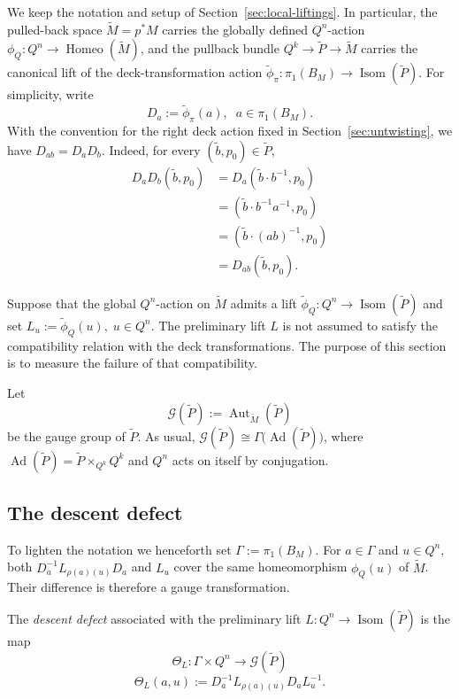 \documentclass[11pt,a4paper]{article}
\numberwithin{equation}{section}
\theoremstyle{named}
\begin{document}
We keep the notation and setup of Section~\ref{sec:local-liftings}. In particular, the pulled-back space \(\widetilde M=p^*M\) carries the globally defined \(Q^n\)-action $\phi_Q:Q^n\longrightarrow\operatorname{Homeo}(\widetilde M)$,
and the pullback bundle $Q^k\longrightarrow\widetilde P\longrightarrow\widetilde M$
carries the canonical lift of the deck-transformation action $\widetilde\phi_\pi:\pi_1(B_M)\longrightarrow
\operatorname{Isom}(\widetilde P)$.
For simplicity, write
\[
D_a:=\widetilde\phi_\pi(a),
\;\; a\in\pi_1(B_M).
\]
With the convention for the right deck action fixed in
Section~\ref{sec:untwisting}, we have $D_{ab}=D_aD_b$. Indeed, for every \((\widetilde b,p_0)\in\widetilde P\),
\begin{align*}
D_aD_b(\widetilde b,p_0)
&=
D_a(\widetilde b\cdot b^{-1},p_0)
\\
&=
(\widetilde b\cdot b^{-1}a^{-1},p_0)
\\
&=
(\widetilde b\cdot (ab)^{-1},p_0)
\\
&=
D_{ab}(\widetilde b,p_0).
\end{align*}

Suppose that the global \(Q^n\)-action on \(\widetilde M\) admits a lift $\widetilde\phi_Q:
Q^n\longrightarrow\operatorname{Isom}(\widetilde P)$ and set $L_u:=\widetilde\phi_Q(u),\;
u\in Q^n$.
The  preliminary lift \(L\) is not assumed to satisfy the compatibility relation with the deck transformations. The purpose of this section is to measure the failure of that compatibility.

Let
\[
\mathcal G(\widetilde P)
:=
\operatorname{Aut}_{\widetilde M}(\widetilde P)
\]
be the gauge group of \(\widetilde P\). As usual, $\mathcal G(\widetilde P)
\cong
\Gamma\bigl(\operatorname{Ad}(\widetilde P)\bigr)$,
where $\operatorname{Ad}(\widetilde P)
=
\widetilde P\times_{Q^k}Q^k$
and \(Q^n\) acts on itself by conjugation. 

\subsection{The descent defect}

To lighten the notation we henceforth set $\Gamma:=\pi_1(B_M)$. For \(a\in\Gamma\) and \(u\in Q^n\), both $D_a^{-1}L_{\rho(a)(u)}D_a$
and $L_u$
cover the same homeomorphism \(\phi_Q(u)\) of \(\widetilde M\). Their difference is therefore a gauge transformation.

\begin{definition}
\label{def:descent-defect}
The \emph{descent defect} associated with the preliminary lift $L:Q^n\longrightarrow\operatorname{Isom}(\widetilde P)$
is the map
\[
\Theta_L:
\Gamma\times Q^n
\longrightarrow
\mathcal G(\widetilde P)
\]
\begin{equation}
\label{eq:descent-defect}
\Theta_L(a,u)
:=
D_a^{-1}L_{\rho(a)(u)}D_aL_u^{-1}.
\end{equation}
\end{definition}
\end{document}

